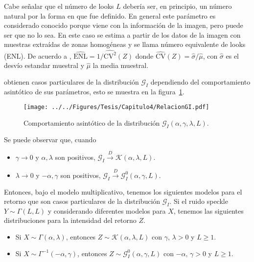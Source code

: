 Cabe señalar que el número de looks $L$ debería ser, en principio, un número natural por la forma en que fue definido. En general este parámetro es considerado conocido porque viene con la información de la imagen, pero puede ser que no lo sea. En este caso se estima a partir de los datos de la imagen con muestras extraídas de zonas homogéneas y se llama número equivalente de looks (ENL). De acuerdo a \citet{anfinsen2009}, $\widehat{\text{ENL}}={1}/{\widehat{\text{CV}^2}(Z)}$ donde $\widehat{\text{CV}}(Z)={\widehat{\sigma}}/{\widehat\mu}$, con $\widehat{\sigma}$ es el desvío estandar muestral y $\widehat\mu$ la media muestral.

\citet{Frery99} obtienen casos particulares de la distribución $\mathcal{G}_I$ dependiendo del comportamiento asintótico de sus parámetros, esto se muestra en la figura~\ref{RelacionGI}.  
\begin{figure}[hbt]
	\centering    
	\texttt{[image: ../../Figures/Tesis/Capitulo4/RelacionGI.pdf]}
	\caption{\label{RelacionGI}Comportamiento asintótico de la distribución $\mathcal{G}_I(\alpha,\gamma,\lambda,L)$.} %
\end{figure} 

Se puede observar que, cuando 
\begin{itemize}
	\item $\gamma \rightarrow 0$ y $\alpha,\lambda$ son positivos, $\mathcal{G}_I \stackrel{D}{\longrightarrow}\mathcal{K}(\alpha,\lambda,L)$.
	\item $\lambda \rightarrow 0$ y $-\alpha,\gamma$ son positivos, $\mathcal{G}_I\stackrel{D}{\longrightarrow}\mathcal{G}_I^0(\alpha,\gamma,L)$.
\end{itemize}

Entonces, bajo el modelo multiplicativo, tenemos los siguientes modelos para el retorno que son casos particulares de la distribución $\mathcal{G}_I$. Si el ruido speckle $Y \sim \Gamma(L,L)$ y considerando diferentes modelos para $X$, tenemos las siguientes distribuciones para la intensidad del retorno $Z$.
\begin{itemize}
	\item Si $X \sim \Gamma(\alpha,\lambda)$, entonces $Z \sim \mathcal{K}(\alpha,\lambda,L)$ con $\gamma, \, \lambda >0$ y $L \geq 1$.
	\item Si $X \sim \Gamma^{-1}(-\alpha,\gamma)$, entonces $Z \sim \mathcal{G}_I^0(\alpha,\gamma,L)$ con $-\alpha, \, \gamma >0$ y $L \geq 1$.
\end{itemize}

